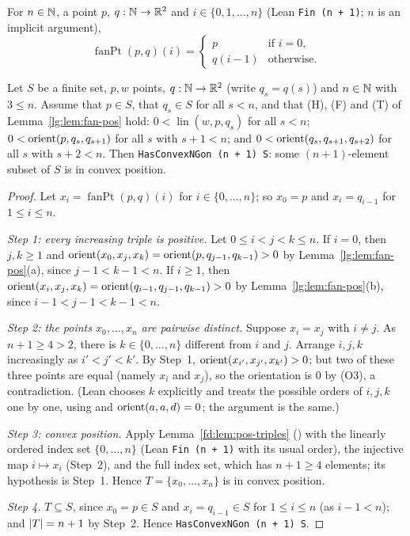 \begin{definition}\label{lg:def:fanpt}
For $n\in\mathbb N$, a point $p$, $q:\mathbb N\to\mathbb R^2$ and $i\in\{0,1,\dots,n\}$ (Lean \texttt{Fin (n + 1)}; $n$ is an implicit
argument),
\[
  \operatorname{fanPt}(p,q)(i)=\begin{cases} p & \text{if } i=0,\\ q(i-1) & \text{otherwise.}\end{cases}
\]
\end{definition}

\begin{theorem}\label{lg:thm:fan}
Let $S$ be a finite set, $p,w$ points, $q:\mathbb N\to\mathbb R^2$ (write $q_s=q(s)$) and $n\in\mathbb N$ with $3\le n$. Assume that $p\in S$,
that $q_s\in S$ for all $s<n$, and that (H), (F) and (T) of Lemma~\ref{lg:lem:fan-pos} hold:
$0<\operatorname{lin}(w,p,q_s)$ for all $s<n$; $0<\operatorname{orient}(p,q_s,q_{s+1})$ for all $s$ with $s+1<n$; and
$0<\operatorname{orient}(q_s,q_{s+1},q_{s+2})$ for all $s$ with $s+2<n$. Then \texttt{HasConvexNGon (n + 1) S}: some $(n+1)$-element
subset of $S$ is in convex position.
\end{theorem}

\begin{proof}
Let $x_i=\operatorname{fanPt}(p,q)(i)$ for $i\in\{0,\dots,n\}$; so $x_0=p$ and $x_i=q_{i-1}$ for $1\le i\le n$.

\emph{Step 1: every increasing triple is positive.} Let $0\le i<j<k\le n$. If $i=0$, then $j,k\ge1$ and
$\operatorname{orient}(x_0,x_j,x_k)=\operatorname{orient}(p,q_{j-1},q_{k-1})>0$ by Lemma~\ref{lg:lem:fan-pos}(a), since $j-1<k-1<n$. If $i\ge1$,
then $\operatorname{orient}(x_i,x_j,x_k)=\operatorname{orient}(q_{i-1},q_{j-1},q_{k-1})>0$ by Lemma~\ref{lg:lem:fan-pos}(b), since
$i-1<j-1<k-1<n$.

\emph{Step 2: the points $x_0,\dots,x_n$ are pairwise distinct.} Suppose $x_i=x_j$ with $i\ne j$. As $n+1\ge4>2$, there
is $k\in\{0,\dots,n\}$ different from $i$ and $j$. Arrange $i,j,k$ increasingly as $i'<j'<k'$. By Step~1,
$\operatorname{orient}(x_{i'},x_{j'},x_{k'})>0$; but two of these three points are equal (namely $x_i$ and $x_j$), so the orientation
is $0$ by (O3), a contradiction. (Lean chooses $k$ explicitly and treats the possible orders of $i,j,k$ one by one,
using  and $\operatorname{orient}(a,a,d)=0$; the argument is the same.)

\emph{Step 3: convex position.} Apply Lemma~\ref{fd:lem:pos-triples} ()
with the linearly ordered index set $\{0,\dots,n\}$ (Lean \texttt{Fin (n + 1)} with its usual order), the injective map
$i\mapsto x_i$ (Step~2), and the full index set, which has $n+1\ge4$ elements; its hypothesis is Step~1. Hence
$T=\{x_0,\dots,x_n\}$ is in convex position.

\emph{Step 4.} $T\subseteq S$, since $x_0=p\in S$ and $x_i=q_{i-1}\in S$ for $1\le i\le n$ (as $i-1<n$); and
$\lvert T\rvert=n+1$ by Step~2. Hence \texttt{HasConvexNGon (n + 1) S}.
\end{proof}

